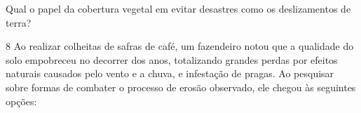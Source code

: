 Qual o papel da cobertura vegetal em evitar desastres como os
deslizamentos de terra?



\num{8} Ao realizar colheitas de safras de café, um fazendeiro
notou que a qualidade do solo empobreceu no decorrer dos anos,
totalizando grandes perdas por efeitos naturais causados pelo vento e a
chuva, e infestação de pragas. Ao pesquisar sobre formas de combater o
processo de erosão observado, ele chegou às seguintes opções:

